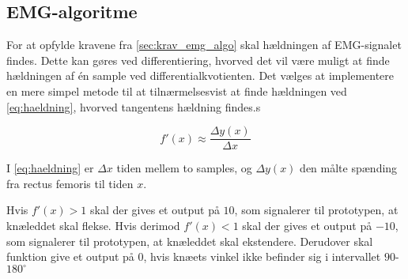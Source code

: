 \subsection{EMG-algoritme}
For at opfylde kravene fra \autoref{sec:krav_emg_algo} skal hældningen af EMG-signalet findes. Dette kan gøres ved differentiering, hvorved det vil være muligt at finde hældningen af én sample ved differentialkvotienten. Det vælges at implementere en mere simpel metode til at tilnærmelsesvist at finde hældningen ved \autoref{eq:haeldning}, hvorved tangentens hældning findes.s

\begin{equation}
f'(x)\approx\dfrac{\Delta y(x)}{\Delta x}
\label{eq:haeldning}
\end{equation}

\noindent
I \autoref{eq:haeldning} er $\Delta x$ tiden mellem to samples, og $\Delta y(x)$ den målte spænding fra rectus femoris til tiden $x$. 

Hvis $f'(x)>1$ skal der gives et output på $10$, som signalerer til prototypen, at knæleddet skal flekse. Hvis derimod $f'(x)<1$ skal der gives et output på $-10$, som signalerer til prototypen, at knæleddet skal ekstendere. Derudover skal funktion give et output på $0$, hvis knæets vinkel ikke befinder sig i intervallet $90$-$180^{\circ}$